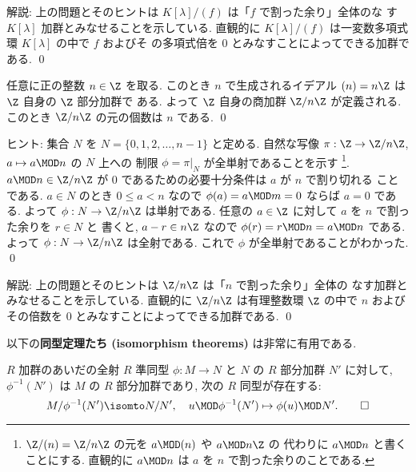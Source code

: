 \documentclass[12pt,twoside]{jarticle}
\begin{document}
\medskip
\noindent
解説: 上の問題とそのヒントは $K[\lambda]/(f)$ は「$f$ で割った余り」全体のな
す $K[\lambda]$ 加群とみなせることを示している.  
直観的に $K[\lambda]/(f)$ は一変数多項式環 $K[\lambda]$ の中で $f$ およびそ
の多項式倍を $0$ とみなすことによってできる加群である.
\qed


\begin{question}
\label{q:|Z/nZ|}
  任意に正の整数 $n\in\Z$ を取る.
  このとき $n$ で生成されるイデアル $(n)=n\Z$ は $\Z$ 自身の $\Z$ 部分加群で
  ある.  よって $\Z$ 自身の商加群 $\Z/n\Z$ が定義される.
  このとき $\Z/n\Z$ の元の個数は $n$ である.
  \qed
\end{question}

\noindent
ヒント: 集合 $N$ を $N=\{0,1,2,\dots,n-1\}$ と定める.
自然な写像 $\pi:\Z\to \Z/n\Z$, $a\mapsto a\MOD n$ の $N$ 上への
制限 $\phi=\pi|_N$ が全単射であることを示す%
  \footnote{$\Z/(n)=\Z/n\Z$ の元を $a\MOD(n)$ や $a\MOD n\Z$ の
    代わりに $a\MOD n$ と書くことにする. 
    直観的に $a\MOD n$ は $a$ を $n$ で割った余りのことである.}.
$a\MOD n\in\Z/n\Z$ が $0$ であるための必要十分条件は $a$ が $n$ で割り切れる
ことである.  $a\in N$ のとき $0\le a < n$ なので $\phi(a)=a\MOD m=0$ 
ならば $a=0$ である. よって $\phi:N\to\Z/n\Z$ は単射である.
任意の $a\in\Z$ に対して $a$ を $n$ で割った余りを $r\in N$ と
書くと, $a-r\in n\Z$ なので $\phi(r)=r\MOD n=a\MOD n$ である.
よって $\phi:N\to\Z/n\Z$ は全射である.
これで $\phi$ が全単射であることがわかった.
\qed

\medskip
\noindent
解説: 上の問題とそのヒントは $\Z/n\Z$ は「$n$ で割った余り」全体の
なす加群とみなせることを示している.  
直観的に $\Z/n\Z$ は有理整数環 $\Z$ の中で $n$ および
その倍数を $0$ とみなすことによってできる加群である.
\qed

\bigskip

以下の{\bf 同型定理たち (isomorphism theorems)} は非常に有用である.

\begin{question}
\label{q:isom-theorem-1}
  $R$ 加群のあいだの全射 $R$ 準同型 $\phi:M\to N$ と $N$ の $R$ 
  部分加群 $N'$ に対して, $\phi^{-1}(N')$ は $M$ 
  の $R$ 部分加群であり, 次の $R$ 同型が存在する:
  \begin{equation*}
    M/\phi^{-1}(N') \isomto N/N',
    \quad
    u\MOD\phi^{-1}(N') \mapsto \phi(u)\MOD N'.
  \qed
  \end{equation*}
\end{question}
\end{document}
